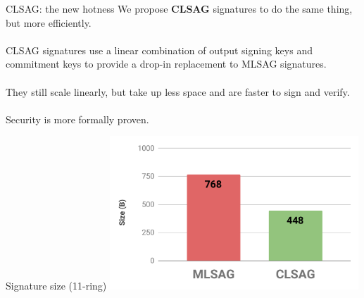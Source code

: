 \documentclass[aspectratio=169]{beamer}
\begin{document}
\begin{frame}{CLSAG: the new hotness}
We propose \textbf{CLSAG} signatures to do the same thing, but more efficiently. \\~\\

CLSAG signatures use a linear combination of output signing keys and commitment keys to provide a drop-in replacement to MLSAG signatures. \\~\\

They still scale linearly, but take up less space and are faster to sign and verify. \\~\\

Security is more formally proven.
\end{frame}


\begin{frame}{Signature size (11-ring)}
\centering
\includegraphics[width=0.7\textwidth]{sig-size.pdf}
\end{frame}
\end{document}
